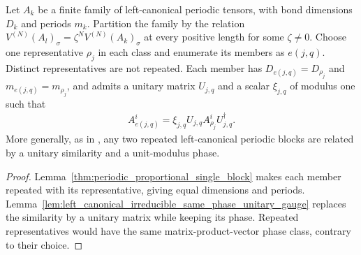 \begin{lemma}
    \label{thm:periodic_phase_class_unitary_match}
    \leanok
    Let $A_k$ be a finite family of left-canonical periodic tensors, with
    bond dimensions $D_k$ and periods $m_k$. Partition the family by the
    relation $V^{(N)}(A_l)_\sigma=\zeta^N V^{(N)}(A_k)_\sigma$ at every positive length for some
    $\zeta\ne0$. Choose one representative $\rho_j$ in each class and enumerate
    its members as $e(j,q)$.
    Distinct representatives are not repeated. Each member has
    $D_{e(j,q)}=D_{\rho_j}$ and $m_{e(j,q)}=m_{\rho_j}$, and admits a unitary
    matrix $U_{j,q}$ and a scalar $\xi_{j,q}$ of modulus one such that
    \begin{align}
        \label{eq:periodic_phase_class_unitary}
        A_{e(j,q)}^i
        =\xi_{j,q}U_{j,q}A_{\rho_j}^iU_{j,q}^{\dagger}.
    \end{align}
    More generally, as in \cite[Section~2.1 and the paragraph following
        Theorem~3.4]{DeLasCuevas2017Irreducible}, any two repeated left-canonical
    periodic blocks are related by a unitary similarity and a unit-modulus
    phase.
\end{lemma}

\begin{proof}
    \leanok
    Lemma~\ref{thm:periodic_proportional_single_block} makes each member
    repeated with its representative, giving equal dimensions and periods.
    Lemma~\ref{lem:left_canonical_irreducible_same_phase_unitary_gauge}
    replaces the similarity by a unitary matrix while keeping its phase.
    Repeated representatives would have the same matrix-product-vector
    phase class, contrary to their choice.
\end{proof}

